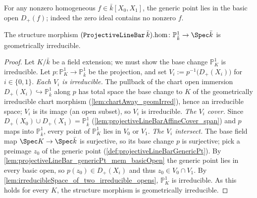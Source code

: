 \begin{lemma}
  \label{lem:projectiveLineBar_genericPt_mem_basicOpen}
  For any nonzero homogeneous \(f \in \bar k[X_0, X_1]\), the generic point lies in the basic open
  \(D_+(f)\); indeed the zero ideal contains no nonzero \(f\).
\end{lemma}
\begin{lemma}
  \label{lem:projectiveLineBar_geomIrred}
  The structure morphism \((\mathtt{ProjectiveLineBar}\,\bar k).\mathrm{hom} \colon
  \mathbb P^1_{\bar k} \to \Spec \bar k\) is geometrically irreducible.
\end{lemma}
\begin{proof}\leanok
  Let \(K/\bar k\) be a field extension; we must show the base change \(\mathbb P^1_K\) is
  irreducible. Let \(p \colon \mathbb P^1_K \to \mathbb P^1_{\bar k}\) be the projection, and set
  \(V_i := p^{-1}\bigl(D_+(X_i)\bigr)\) for \(i \in \{0, 1\}\).
  \emph{Each \(V_i\) is irreducible.} The pullback of the chart open immersion
  \(D_+(X_i) \hookrightarrow \mathbb P^1_{\bar k}\) along \(p\) has total space the base change to
  \(K\) of the geometrically irreducible chart morphism (\cref{lem:chartAway_geomIrred}), hence an
  irreducible space; \(V_i\) is its image (an open subset), so \(V_i\) is irreducible.
  \emph{The \(V_i\) cover.} Since \(D_+(X_0) \cup D_+(X_1) = \mathbb P^1_{\bar k}\)
  (\cref{lem:projectiveLineBarAffineCover_span}) and \(p\) maps into
  \(\mathbb P^1_{\bar k}\), every point of \(\mathbb P^1_K\) lies in \(V_0\) or \(V_1\).
  \emph{The \(V_i\) intersect.} The base field map \(\Spec K \to \Spec \bar k\) is surjective, so
  its base change \(p\) is surjective; pick a preimage \(z_0\) of the generic point
  (\cref{def:projectiveLineBarGenericPt}). By
  \cref{lem:projectiveLineBar_genericPt_mem_basicOpen} the generic point lies in every basic open,
  so \(p(z_0) \in D_+(X_i)\) and thus \(z_0 \in V_0 \cap V_1\).
  By \cref{lem:irreducibleSpace_of_two_irreducible_opens}, \(\mathbb P^1_K\) is irreducible. As
  this holds for every \(K\), the structure morphism is geometrically irreducible.
\end{proof}

